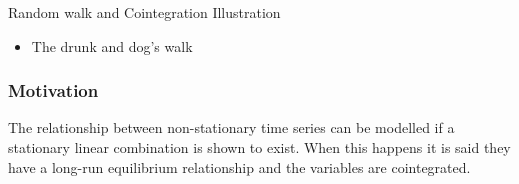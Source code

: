 \documentclass{beamer}
\begin{document}
\begin{frame}[t,fragile]{Random walk and Cointegration Illustration}
 \begin{itemize}
  \item The drunk and dog's walk
 \end{itemize}
    \begin{center}
    \end{center}
\end{frame}


\begin{frame}
\frametitle{Motivation}

The relationship between non-stationary time series can be modelled if a stationary linear combination is shown to exist.
When this happens it is said they have a long-run
equilibrium relationship and the variables are {\color{red} cointegrated}.
\

\end{frame}
\end{document}
